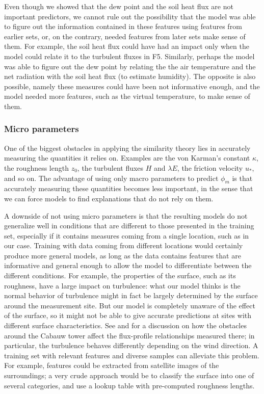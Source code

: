 \documentclass[a4paper,11pt]{kth-mag}
\begin{document}
Even though we showed that the dew point and the soil heat flux are not important predictors, we cannot rule out the possibility that the model was able to figure out the information contained in these features using features from earlier sets, or, on the contrary, needed features from later sets make sense of them. For example, the soil heat flux could have had an impact only when the model could relate it to the turbulent fluxes in F5. Similarly, perhaps the model was able to figure out the dew point by relating the the air temperature and the net radiation with the soil heat flux (to estimate humidity). The opposite is also possible, namely these measures could have been not informative enough, and the model needed more features, such as the virtual temperature, to make sense of them.

\subsubsection{Micro parameters} One of the biggest obstacles in applying the similarity theory lies in accurately measuring the quantities it relies on. Examples are the von Karman's constant $\kappa$, the roughness length $z_0$, the turbulent fluxes $H$ and $\lambda E$, the friction velocity $u_*$, and so on. The advantage of using only macro parameters to predict $\phi_m$ is that accurately measuring these quantities becomes less important, in the sense that we can force models to find explanations that do not rely on them.

A downside of not using micro parameters is that the resulting models do not generalize well in conditions that are different to those presented in the training set, especially if it contains measures coming from a single location, such as in our case. Training with data coming from different locations would certainly produce more general models, as long as the data contains features that are informative and general enough to allow the model to differentiate between the different conditions. For example, the properties of the surface, such as its roughness, have a large impact on turbulence: what our model thinks is the normal behavior of turbulence might in fact be largely determined by the surface around the measurement site. But our model is completely unaware of the effect of the surface, so it might not be able to give accurate predictions at sites with different surface characteristics. See \cite{cabauw_surface} and \cite{cabauw_z0} for a discussion on how the obstacles around the Cabauw tower affect the flux-profile relationships measured there; in particular, the turbulence behaves differently depending on the wind direction. A training set with relevant features and diverse samples can alleviate this problem. For example, features could be extracted from satellite images of the surroundings; a very crude approach would be to classify the surface into one of several categories, and use a lookup table with pre-computed roughness lengths.
\end{document}
